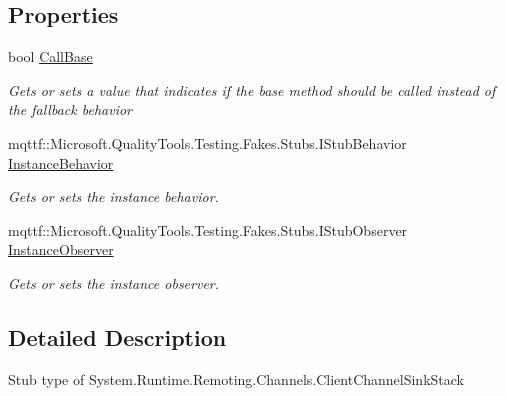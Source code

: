 \subsection*{Properties}
\begin{DoxyCompactItemize}
\item 
bool \hyperlink{class_system_1_1_runtime_1_1_remoting_1_1_channels_1_1_fakes_1_1_stub_client_channel_sink_stack_aeb5c0d4ce6c1e5e90fb69d96b70cd7ca}{Call\-Base}
\begin{DoxyCompactList}\small\item\em Gets or sets a value that indicates if the base method should be called instead of the fallback behavior\end{DoxyCompactList}\item 
mqttf\-::\-Microsoft.\-Quality\-Tools.\-Testing.\-Fakes.\-Stubs.\-I\-Stub\-Behavior \hyperlink{class_system_1_1_runtime_1_1_remoting_1_1_channels_1_1_fakes_1_1_stub_client_channel_sink_stack_abac70930c886b2202ce5e27b0a60e5f3}{Instance\-Behavior}
\begin{DoxyCompactList}\small\item\em Gets or sets the instance behavior.\end{DoxyCompactList}\item 
mqttf\-::\-Microsoft.\-Quality\-Tools.\-Testing.\-Fakes.\-Stubs.\-I\-Stub\-Observer \hyperlink{class_system_1_1_runtime_1_1_remoting_1_1_channels_1_1_fakes_1_1_stub_client_channel_sink_stack_a71ecbfd9d41e0a48d933d96640c804c6}{Instance\-Observer}
\begin{DoxyCompactList}\small\item\em Gets or sets the instance observer.\end{DoxyCompactList}\end{DoxyCompactItemize}


\subsection{Detailed Description}
Stub type of System.\-Runtime.\-Remoting.\-Channels.\-Client\-Channel\-Sink\-Stack



